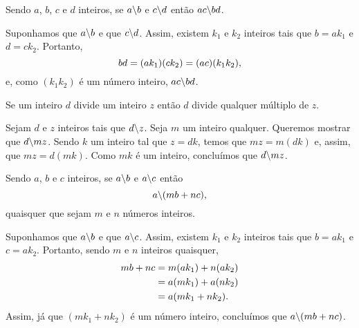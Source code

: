 \begin{Propr}
  Sendo $a$, $b$, $c$ e $d$ inteiros,
  se $a\backslash b$ e $c\backslash d$ então
  $ac\backslash bd$.
\end{Propr}

\begin{dem}
  Suponhamos que $a\backslash b$ e que
  $c\backslash d$. Assim, existem $k_1$ e $k_2$ inteiros tais que $b=ak_1$ e
  $d=ck_2$.
  Portanto,
  \begin{equation*}
      bd = (ak_1)(ck_2)
         = (ac)(k_1k_2)\mathrm{,}
  \end{equation*}
  e, como $(k_1k_2)$ é um número inteiro, $ac\backslash bd$.
\end{dem}

\begin{Propr}
  Se um inteiro $d$ divide um inteiro $z$ então $d$ divide qualquer
  múltiplo de $z$.
\end{Propr}

\begin{dem}
  Sejam $d$ e $z$ inteiros tais que $d\backslash z$. Seja $m$ um inteiro
  qualquer. Queremos mostrar que $d\backslash mz$. Sendo $k$ um inteiro tal
  que $z = dk$, temos que $mz = m(dk)$ e, assim, que $mz = d(mk)$. Como
  $mk$ é um inteiro, concluímos que $d\backslash mz$.
\end{dem}

\begin{Propr}\label{dividecombinacaolinear}
  Sendo $a$, $b$ e $c$ inteiros, se $a\backslash b$ e $a\backslash c$ então
  \begin{equation*}
    a\backslash (mb+nc)\mathrm{,}
  \end{equation*}
  quaisquer que sejam $m$ e $n$ números inteiros.
\end{Propr}

\begin{dem}
  Suponhamos que $a\backslash b$ e que
  $a\backslash c$. Assim, existem $k_1$ e $k_2$ inteiros tais que $b = ak_1$
  e $c = ak_2$.
  Portanto, sendo $m$ e $n$ inteiros quaisquer,
  \begin{equation*}
    \begin{aligned}
      mb+nc &= m(ak_1) + n(ak_2)\\
            &= a(mk_1) + a(nk_2)\\
            &= a(mk_1+nk_2)\mathrm{.}
    \end{aligned}
  \end{equation*}
  Assim, já que $(mk_1+nk_2)$ é um número inteiro, concluímos que
  $a\backslash (mb+nc)$.
\end{dem}

